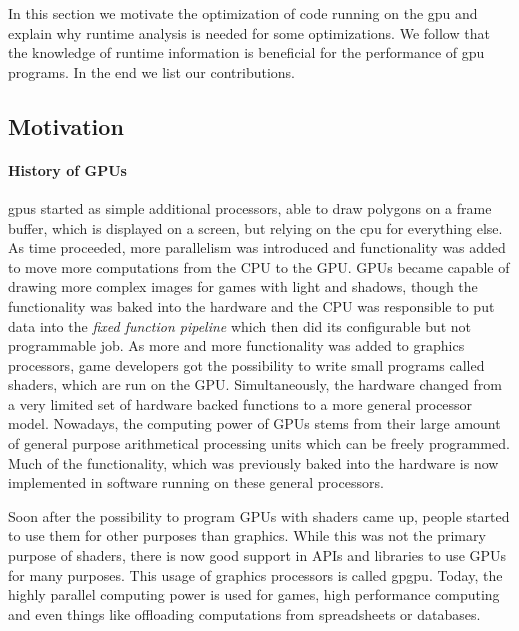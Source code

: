 {}
In this section we motivate the optimization of code running on the \gls{gpu} and explain why runtime analysis is needed for some optimizations. We follow that the knowledge of runtime information is beneficial for the performance of \gls{gpu} programs. In the end we list our contributions.

\subsection{Motivation}
\label{sub:motivation}
\paragraph{History of GPUs} \Glspl{gpu} started as simple additional processors, able to draw polygons on a frame buffer, which is displayed on a screen, but relying on the \gls{cpu} for everything else. As time proceeded, more parallelism was introduced and functionality was added to move more computations from the CPU to the GPU. GPUs became capable of drawing more complex images for games with light and shadows, though the functionality was baked into the hardware and the CPU was responsible to put data into the \emph{fixed function pipeline} which then did its configurable but not programmable job.
As more and more functionality was added to graphics processors, game developers got the possibility to write small programs called shaders, which are run on the GPU. Simultaneously, the hardware changed from a very limited set of hardware backed functions to a more general processor model. Nowadays, the computing power of GPUs stems from their large amount of general purpose arithmetical processing units which can be freely programmed. Much of the functionality, which was previously baked into the hardware is now implemented in software running on these general processors.~\cite{McClanahan2010}

Soon after the possibility to program GPUs with shaders came up, people started to use them for other purposes than graphics. While this was not the primary purpose of shaders, there is now good support in APIs and libraries to use GPUs for many purposes. This usage of graphics processors is called \gls{gpgpu}. Today, the highly parallel computing power is used for games, high performance computing and even things like offloading computations from spreadsheets or databases.~\cite{Lillqvist2016, Meraji2015}

